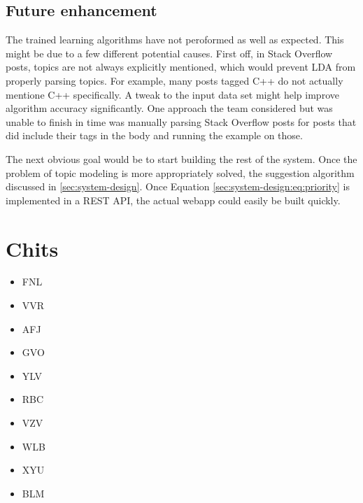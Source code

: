 \subsection{Future enhancement}
The trained learning algorithms have not peroformed as well as
expected.
This might be due to a few different potential causes.
First off, in Stack Overflow posts, topics are not always explicitly
mentioned, which would prevent LDA from properly parsing topics.
For example, many posts tagged C++ do not actually mentione C++
specifically.
A tweak to the input data set might help improve algorithm accuracy
significantly.
One approach the team considered but was unable to finish in time was
manually parsing Stack Overflow posts for posts that did include their
tags in the body and running the example on those.  

The next obvious goal would be to start building the rest of the
system.
Once the problem of topic modeling is more appropriately solved, the
suggestion algorithm discussed in \ref{sec:system-design}.
Once Equation \ref{sec:system-design:eq:priority} is implemented in a REST API, the
actual webapp could easily be built quickly.  

\section{Chits}
\begin{itemize}
\item FNL
\item VVR
\item AFJ
\item GVO
\item YLV
\item RBC
\item VZV
\item WLB
\item XYU
\item BLM
\end{itemize}


 